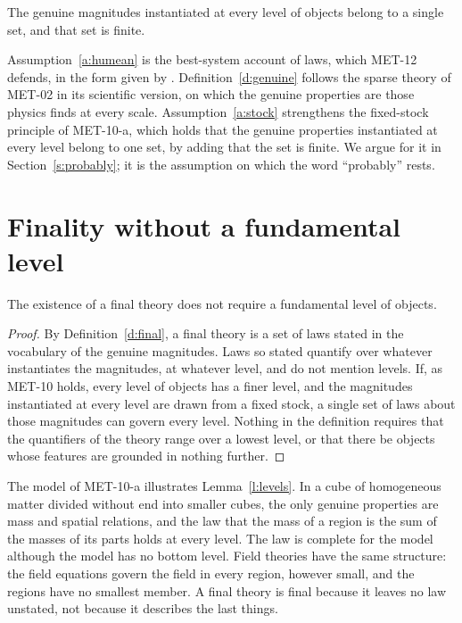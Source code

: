 \documentclass{situationist-preprint}
\begin{document}
\begin{assumption}\label{a:stock}
The genuine magnitudes instantiated at every level of objects belong to a single set, and that set is finite.
\end{assumption}

Assumption~\ref{a:humean} is the best-system account of laws, which MET-12 defends, in the form given by \citet{Lewis1973,Lewis1994}. Definition~\ref{d:genuine} follows the sparse theory of MET-02 in its scientific version, on which the genuine properties are those physics finds at every scale. Assumption~\ref{a:stock} strengthens the fixed-stock principle of MET-10-a, which holds that the genuine properties instantiated at every level belong to one set, by adding that the set is finite. We argue for it in Section~\ref{s:probably}; it is the assumption on which the word \enquote{probably} rests.

\section{Finality without a fundamental level}

\begin{lemma}\label{l:levels}
The existence of a final theory does not require a fundamental level of objects.
\end{lemma}

\begin{proof}
By Definition~\ref{d:final}, a final theory is a set of laws stated in the vocabulary of the genuine magnitudes. Laws so stated quantify over whatever instantiates the magnitudes, at whatever level, and do not mention levels. If, as MET-10 holds, every level of objects has a finer level, and the magnitudes instantiated at every level are drawn from a fixed stock, a single set of laws about those magnitudes can govern every level. Nothing in the definition requires that the quantifiers of the theory range over a lowest level, or that there be objects whose features are grounded in nothing further.
\end{proof}

The model of MET-10-a illustrates Lemma~\ref{l:levels}. In a cube of homogeneous matter divided without end into smaller cubes, the only genuine properties are mass and spatial relations, and the law that the mass of a region is the sum of the masses of its parts holds at every level. The law is complete for the model although the model has no bottom level. Field theories have the same structure: the field equations govern the field in every region, however small, and the regions have no smallest member. A final theory is final because it leaves no law unstated, not because it describes the last things.
\end{document}
